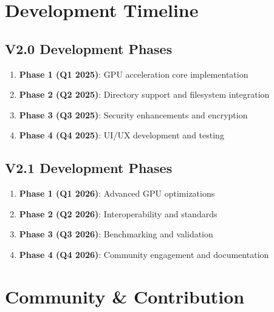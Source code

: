\documentclass[12pt,a4paper]{article}
\begin{document}
\section{Development Timeline}

\subsection{V2.0 Development Phases}
\begin{enumerate}
    \item \textbf{Phase 1 (Q1 2025)}: GPU acceleration core implementation
    \item \textbf{Phase 2 (Q2 2025)}: Directory support and filesystem integration
    \item \textbf{Phase 3 (Q3 2025)}: Security enhancements and encryption
    \item \textbf{Phase 4 (Q4 2025)}: UI/UX development and testing
\end{enumerate}

\subsection{V2.1 Development Phases}
\begin{enumerate}
    \item \textbf{Phase 1 (Q1 2026)}: Advanced GPU optimizations
    \item \textbf{Phase 2 (Q2 2026)}: Interoperability and standards
    \item \textbf{Phase 3 (Q3 2026)}: Benchmarking and validation
    \item \textbf{Phase 4 (Q4 2026)}: Community engagement and documentation
\end{enumerate}

\section{Community \& Contribution}
\end{document}

